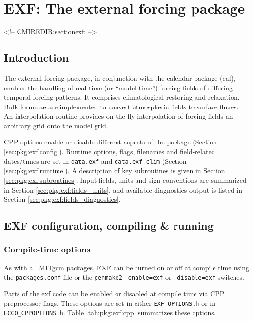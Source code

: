 \section{EXF: The external forcing package
\label{sec:pkg:exf}}
\begin{rawhtml}
<!-- CMIREDIR:sectionexf: -->
\end{rawhtml}


\subsection{Introduction
\label{sec:pkg:exf:intro}}

The external forcing package, in conjunction with the
calendar package (cal), enables the handling of real-time
(or ``model-time'') forcing
fields of differing temporal forcing patterns.
It comprises climatological restoring and relaxation.
Bulk formulae are implemented to convert atmospheric fields
to surface fluxes.
An interpolation routine provides on-the-fly interpolation of
forcing fields an arbitrary grid onto the model grid.

CPP options enable or disable different aspects of the package
(Section \ref{sec:pkg:exf:config}).
Runtime options, flags, filenames and field-related dates/times are
set in \texttt{data.exf} and \texttt{data.exf\_clim}
(Section \ref{sec:pkg:exf:runtime}).
A description of key subroutines is given in Section
\ref{sec:pkg:exf:subroutines}.
Input fields, units and sign conventions are summarized in
Section \ref{sec:pkg:exf:fields_units}, and available diagnostics
output is listed in Section \ref{sec:pkg:exf:fields_diagnostics}.


\subsection{EXF configuration, compiling \& running}

\subsubsection{Compile-time options
\label{sec:pkg:exf:config}}

As with all MITgcm packages, EXF can be turned on or off at compile time
using the \texttt{packages.conf} file or the \texttt{genmake2}
\texttt{-enable=exf} or \texttt{-disable=exf} switches.

Parts of the exf code can be enabled or disabled at compile time
via CPP preprocessor flags. These options are set in either
\texttt{EXF\_OPTIONS.h} or in \texttt{ECCO\_CPPOPTIONS.h}.
Table \ref{tab:pkg:exf:cpp} summarizes these options.

